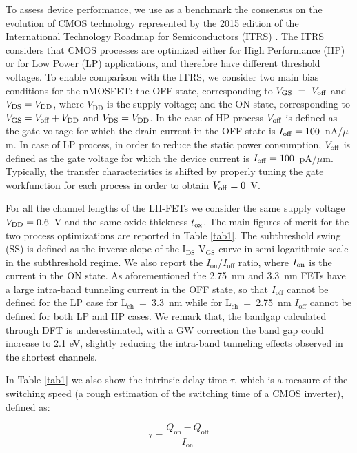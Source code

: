 \documentclass[aps,reprint,superscriptaddress,secnumarabic,amssymb,showpacs]{revtex4-1}
\begin{document}
To assess device performance, we use as a benchmark the consensus on the evolution of CMOS technology represented by the 
2015 edition of the International Technology Roadmap for Semiconductors (ITRS) \cite{ITRS}. The ITRS considers that CMOS processes are optimized either for High Performance (HP) or for Low Power (LP) applications, and therefore have different threshold voltages. 
To enable comparison with the ITRS, we consider two main bias conditions for the nMOSFET: the OFF state, corresponding to $V_{\rm GS}~=~V_{\rm off}$ and $V_{\rm DS} = V_{\rm DD}$, where $V_{\text{DD}}$ is the supply voltage; and the ON state, corresponding to $V_{\rm GS} = V_{\rm off} + V_{\rm DD}$ and $V_{\rm DS} = V_{\rm DD}$. In the case of HP process $V_{\rm off}$ is defined as the gate voltage for which the drain current in the OFF state is $I_{\rm off} = 100$~nA/$\mu$m. In case of LP process, in order to reduce the static power consumption, $V_{\rm off}$ is defined as the gate voltage for which the device current is $I_{\rm off} = 100$~pA/$\mu$m. Typically, the transfer characteristics is shifted by properly tuning the gate workfunction for each process in order to obtain $V_{\rm off} = 0$~V.

For all the channel lengths of the LH-FETs we consider the same supply voltage $V_{\rm DD} = 0.6$~V and the same oxide thickness $t_{\rm ox}$. The main figures of merit for the two process optimizations are reported in Table \ref{tab1}. The subthreshold swing (SS) is defined as the inverse slope of the I$_{\text{DS}}$-V$_{\text{GS}}$ curve in semi-logarithmic scale in the subthreshold regime. We also report the $I_{\text{on}}$/$I_{\text{off}}$ ratio, where $I_{\rm on}$ is the current in the ON state. As aforementioned the 2.75~nm and 3.3~nm FETs have a large intra-band tunneling current in the OFF state, so that $I_{\text{off}}$ cannot be defined for the LP case for L$_{\text{ch}}$~=~3.3~nm while for L$_{\text{ch}}$~=~2.75~nm $I_{\text{off}}$ cannot be defined for both LP and HP cases. We remark that, the bandgap calculated through DFT is underestimated, with a GW correction the band gap could increase to 2.1 eV, slightly reducing the intra-band tunneling effects observed in the shortest channels.

In Table \ref{tab1} we also show the intrinsic delay time $\tau$, which is a measure of the switching speed (a rough estimation of the switching time of a CMOS inverter), defined as:

\begin{equation}
\tau = \frac{Q_{\text{on}}-Q_{\text{off}}}{I_{\text{on}}} 
\end{equation}
\end{document}
